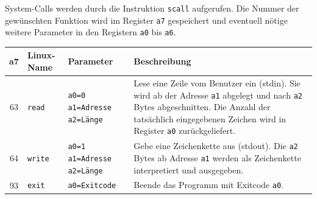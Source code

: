 \documentclass[a4paper,11pt]{article}
\begin{document}
	System-Calls werden durch die Instruktion \texttt{scall} aufgerufen.
	Die Nummer der gewünschten Funktion wird im Register \texttt{a7} gespeichert und eventuell nötige weitere Parameter in den Registern \texttt{a0} bis \texttt{a6}.
	
	\begin{center}
		\begin{tabular}{clp{2.5cm}p{7cm}}
			\toprule
			\textbf{a7} & \textbf{Linux-Name} & \textbf{Parameter} & \textbf{Beschreibung} \\
			\midrule
			63 & \texttt{read} & \texttt{a0=0} \newline \texttt{a1=Adresse} \newline \texttt{a2=Länge} &
				Lese eine Zeile vom Benutzer ein (stdin).
				Sie wird ab der Adresse \texttt{a1} abgelegt und nach \texttt{a2} Bytes abgeschnitten.
				Die Anzahl der tatsächlich eingegebenen Zeichen wird in Register \texttt{a0} zurückgeliefert. \\[6pt]
			64 & \texttt{write} & \texttt{a0=1} \newline \texttt{a1=Adresse} \newline \texttt{a2=Länge} &
				Gebe eine Zeichenkette aus (stdout).
				Die \texttt{a2} Bytes ab Adresse \texttt{a1} werden als Zeichenkette interpretiert und ausgegeben. \\[6pt]
			93 & \texttt{exit} & \texttt{a0=Exitcode} &
				Beende das Programm mit Exitcode \texttt{a0}. \\
			\bottomrule
		\end{tabular}
	\end{center}
	
\end{document}

